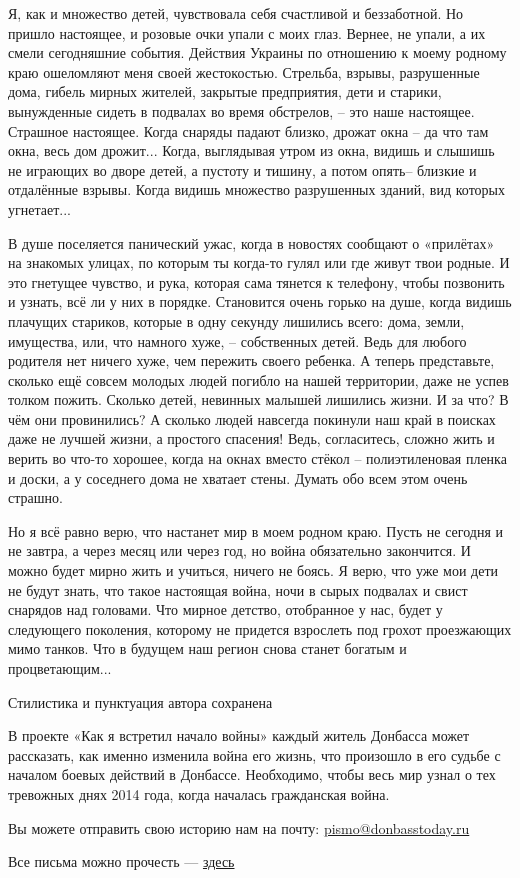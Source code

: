 Я, как и множество детей, чувствовала себя счастливой и беззаботной. Но пришло
настоящее, и розовые очки упали с моих глаз. Вернее, не упали, а их смели
сегодняшние события. Действия Украины по отношению к моему родному краю
ошеломляют меня своей жестокостью. Стрельба, взрывы, разрушенные дома, гибель
мирных жителей, закрытые предприятия, дети и старики, вынужденные сидеть в
подвалах во время обстрелов, – это наше настоящее. Страшное настоящее. Когда
снаряды падают близко, дрожат окна – да что там окна, весь дом дрожит... Когда,
выглядывая утром из окна, видишь и слышишь не играющих во дворе детей, а
пустоту и тишину, а потом опять– близкие и отдалённые взрывы. Когда видишь
множество разрушенных зданий, вид которых угнетает...

В душе поселяется панический ужас, когда в новостях сообщают о «прилётах» на
знакомых улицах, по которым ты когда-то гулял или где живут твои родные. И это
гнетущее чувство, и рука, которая сама тянется к телефону, чтобы позвонить и
узнать, всё ли у них в порядке. Становится очень горько на душе, когда видишь
плачущих стариков, которые в одну секунду лишились всего: дома, земли,
имущества, или, что намного хуже, – собственных детей. Ведь для любого родителя
нет ничего хуже, чем пережить своего ребенка. А теперь представьте, сколько ещё
совсем молодых людей погибло на нашей территории, даже не успев толком пожить.
Сколько детей, невинных малышей лишились жизни. И за что? В чём они
провинились? А сколько людей навсегда покинули наш край в поисках даже не
лучшей жизни, а простого спасения! Ведь, согласитесь, сложно жить и верить во
что-то хорошее, когда на окнах вместо стёкол – полиэтиленовая пленка и доски, а
у соседнего дома не хватает стены. Думать обо всем этом очень страшно.

Но я всё равно верю, что настанет мир в моем родном краю. Пусть не сегодня и не
завтра, а через месяц или через год, но война обязательно закончится. И можно
будет мирно жить и учиться, ничего не боясь. Я верю, что уже мои дети не будут
знать, что такое настоящая война, ночи в сырых подвалах и свист снарядов над
головами. Что мирное детство, отобранное у нас, будет у следующего поколения,
которому не придется взрослеть под грохот проезжающих мимо танков. Что в
будущем наш регион снова станет богатым и процветающим...

Стилистика и пунктуация автора сохранена


В проекте «Как я встретил начало войны» каждый житель Донбасса может
рассказать, как именно изменила война его жизнь, что произошло в его судьбе с
началом боевых действий в Донбассе. Необходимо, чтобы весь мир узнал о тех
тревожных днях 2014 года, когда началась гражданская война.

Вы можете отправить свою историю нам на почту: \url{pismo@donbasstoday.ru}

Все письма можно прочесть —  \href{https://donbasstoday.ru/category/segodnya/pisma}{здесь}
